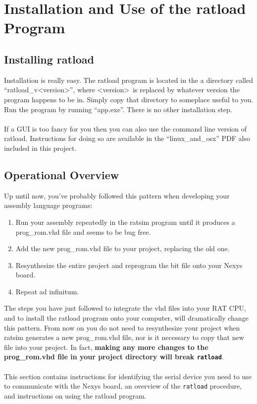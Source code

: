 \documentclass[notitlepage]{article}
\begin{document}
\section{Installation and Use of the ratload Program}
\label{sec:installation}
\subsection{Installing ratload}
Installation is really easy. The ratload program is located in the a directory called ``ratload\_v{\textless}version\textgreater'', where {\textless}version\textgreater~is replaced by whatever version the program happens to be in. Simply copy that directory to someplace useful to you. Run the program by running ``app.exe''. There is no other installation step.\\\\
If a GUI is too fancy for you then you can also use the command line version of ratload. Instructions for doing so are available in the ``linux\_and\_osx'' PDF also included in this project.

\subsection{Operational Overview}
Up until now, you've probably followed this pattern when developing your assembly language programs:
\begin{enumerate}
\item Run your assembly repeatedly in the ratsim program until it produces a prog\_rom.vhd file and seems to be bug free.
\item Add the new prog\_rom.vhd file to your project, replacing the old one.
\item Resynthesize the entire project and reprogram the bit file onto your Nexys board.
\item Repeat ad infinitum.
\end{enumerate}
The steps you have just followed to integrate the vhd files into your RAT CPU, and to install the ratload program onto your computer, will dramatically change this pattern. From now on you do not need to resynthesize your project when ratsim generates a new prog\_rom.vhd file, nor is it necessary to copy that new file into your project. In fact, \textbf{making any more changes to the prog\_rom.vhd file in your project directory will break \texttt{ratload}}.\\\\
This section contains instructions for identifying the serial device you need to use to communicate with the Nexys board, an overview of the \texttt{ratload} procedure, and instructions on using the ratload program.
\end{document}
